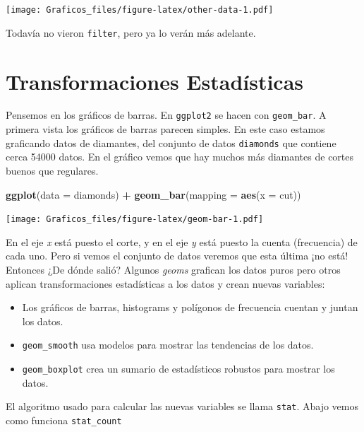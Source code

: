 \documentclass[]{book}
\newenvironment{Shaded}{\begin{snugshade}}{\end{snugshade}}
\newcommand{\DataTypeTok}[1]{\textcolor[rgb]{0.13,0.29,0.53}{#1}}
\newcommand{\KeywordTok}[1]{\textcolor[rgb]{0.13,0.29,0.53}{\textbf{#1}}}
\newcommand{\NormalTok}[1]{#1}
\newcommand{\OperatorTok}[1]{\textcolor[rgb]{0.81,0.36,0.00}{\textbf{#1}}}
\newcommand{\StringTok}[1]{\textcolor[rgb]{0.31,0.60,0.02}{#1}}
\providecommand{\tightlist}{%
  \setlength{\itemsep}{0pt}\setlength{\parskip}{0pt}}
\theoremstyle{definition}
\theoremstyle{definition}
\theoremstyle{definition}
\theoremstyle{remark}
\begin{document}
\texttt{[image: Graficos\_files/figure-latex/other-data-1.pdf]}

Todavía no vieron \texttt{filter}, pero ya lo verán más adelante.

\hypertarget{transformaciones-estadisticas}{%
\section{Transformaciones
Estadísticas}\label{transformaciones-estadisticas}}

Pensemos en los gráficos de barras. En \texttt{ggplot2} se hacen con
\texttt{geom\_bar}. A primera vista los gráficos de barras parecen
simples. En este caso estamos graficando datos de diamantes, del
conjunto de datos \texttt{diamonds} que contiene cerca 54000 datos. En
el gráfico vemos que hay muchos más diamantes de cortes buenos que
regulares.

\begin{Shaded}
\begin{Highlighting}[]
\KeywordTok{ggplot}\NormalTok{(}\DataTypeTok{data =}\NormalTok{ diamonds) }\OperatorTok{+}
\StringTok{  }\KeywordTok{geom_bar}\NormalTok{(}\DataTypeTok{mapping =} \KeywordTok{aes}\NormalTok{(}\DataTypeTok{x =}\NormalTok{ cut))}
\end{Highlighting}
\end{Shaded}

\texttt{[image: Graficos\_files/figure-latex/geom-bar-1.pdf]}

En el eje \emph{x} está puesto el corte, y en el eje \emph{y} está
puesto la cuenta (frecuencia) de cada uno. Pero si vemos el conjunto de
datos veremos que esta última ¡no está! Entonces ¿De dónde salió?
Algunos \emph{geoms} grafican los datos puros pero otros aplican
transformaciones estadísticas a los datos y crean nuevas variables:

\begin{itemize}
\tightlist
\item
  Los gráficos de barras, histograms y polígonos de frecuencia cuentan y
  juntan los datos.
\item
  \texttt{geom\_smooth} usa modelos para mostrar las tendencias de los
  datos.
\item
  \texttt{geom\_boxplot} crea un sumario de estadísticos robustos para
  mostrar los datos.
\end{itemize}

El algoritmo usado para calcular las nuevas variables se llama
\texttt{stat}. Abajo vemos como funciona \texttt{stat\_count}
\end{document}
